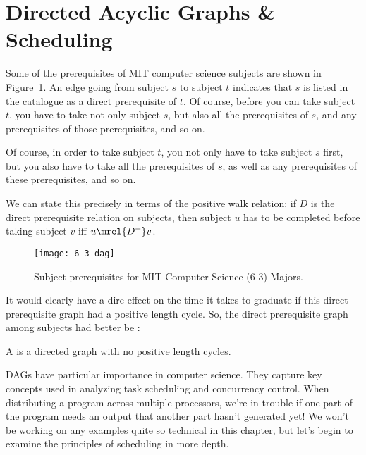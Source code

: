 \begin{problems}
\practiceproblems
{}

\homeworkproblems
{}
\end{problems}

\section{Directed Acyclic Graphs \& Scheduling}\label{dag_sec}

Some of the prerequisites of MIT computer science subjects are shown
in Figure~\ref{6-3_subjects}.  An edge going from subject $s$ to
subject $t$ indicates that $s$ is listed in the catalogue as a direct
prerequisite of $t$.  Of course, before you can take subject $t$, you
have to take not only subject $s$, but also all the prerequisites of $s$,
and any prerequisites of those prerequisites, and so
on.
\begin{editingnotes} Of course, in order to take subject $t$, you
  not only have to take subject $s$ first, but you also have to take
  all the prerequisites of $s$, as well as any prerequisites of these
  prerequisites, and so on.
\end{editingnotes}
We can state this precisely in terms of the positive walk relation: if
$D$ is the direct prerequisite relation on subjects, then subject $u$
has to be completed before taking subject $v$ iff $u \mrel{D^+} v$.

\begin{figure}

\texttt{[image: 6-3\_dag]}

\caption{Subject prerequisites for MIT Computer Science (6-3) Majors.}

\label{6-3_subjects}

\end{figure}

It would clearly have a dire effect on the time it takes to graduate
if this direct prerequisite graph had a positive length cycle. So,
the direct prerequisite graph among subjects had better be
:

\begin{definition}
A  is a directed graph with no
positive length cycles.
\end{definition}

DAGs have particular importance in computer science.  They capture key
concepts used in analyzing task scheduling and concurrency control.
When distributing a program across multiple processors, we're in
trouble if one part of the program needs an output that another part
hasn't generated yet!  We won't be working on any examples quite so
technical in this chapter, but let's begin to examine the principles
of scheduling in more depth.


